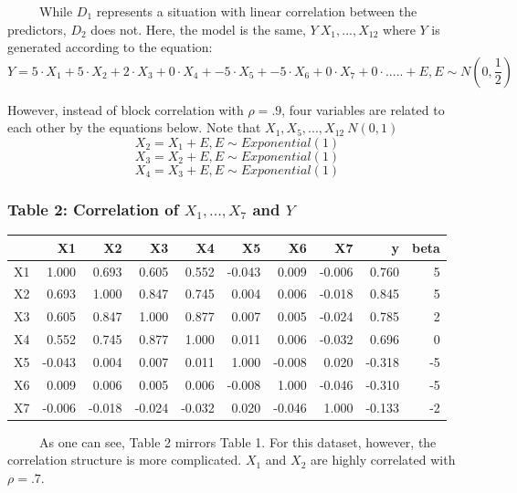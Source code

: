 \documentclass[12pt,twoside]{reedthesis}
\begin{document}
  ~~~~~While \(D_1\) represents a situation with linear correlation
  between the predictors, \(D_2\) does not. Here, the model is the same,
  \(Y~X_1,...,X_12\) where \(Y\) is generated according to the equation:
  \[Y = 5 \cdot X_1 + 5 \cdot X_2 + 2 \cdot X_3 + 0 \cdot X_4 + -5 \cdot X_5 + -5\cdot X_6 + 0\cdot X_7 + 0 \cdot ..... + E, E \sim N(0,\frac 1 2 )\]
  
  However, instead of block correlation with \(\rho = .9\), four variables
  are related to each other by the equations below. Note that
  \(X_1, X_5,...,X_{12} ~ N(0,1)\)
  \[X_2 = X_1 + E, E \sim Exponential(1)\]
  \[X_3 = X_2 + E, E \sim Exponential(1)\]
  \[X_4 = X_3 + E, E \sim Exponential(1)\]
  
  \subsubsection{\texorpdfstring{Table 2: Correlation of \(X_1,..., X_7\)
  and
  \(Y\)}{Table 2: Correlation of X\_1,..., X\_7 and Y}}\label{table-2-correlation-of-x_1...-x_7-and-y}
  
  \begin{tabular}{l|r|r|r|r|r|r|r|r|r}
  \hline
    & X1 & X2 & X3 & X4 & X5 & X6 & X7 & y & beta\\
  \hline
  X1 & 1.000 & 0.693 & 0.605 & 0.552 & -0.043 & 0.009 & -0.006 & 0.760 & 5\\
  \hline
  X2 & 0.693 & 1.000 & 0.847 & 0.745 & 0.004 & 0.006 & -0.018 & 0.845 & 5\\
  \hline
  X3 & 0.605 & 0.847 & 1.000 & 0.877 & 0.007 & 0.005 & -0.024 & 0.785 & 2\\
  \hline
  X4 & 0.552 & 0.745 & 0.877 & 1.000 & 0.011 & 0.006 & -0.032 & 0.696 & 0\\
  \hline
  X5 & -0.043 & 0.004 & 0.007 & 0.011 & 1.000 & -0.008 & 0.020 & -0.318 & -5\\
  \hline
  X6 & 0.009 & 0.006 & 0.005 & 0.006 & -0.008 & 1.000 & -0.046 & -0.310 & -5\\
  \hline
  X7 & -0.006 & -0.018 & -0.024 & -0.032 & 0.020 & -0.046 & 1.000 & -0.133 & -2\\
  \hline
  \end{tabular}
  
  ~~~~~As one can see, Table 2 mirrors Table 1. For this dataset, however,
  the correlation structure is more complicated. \(X_1\) and \(X_2\) are
  highly correlated with \(\rho = .7\).
  
\end{document}

